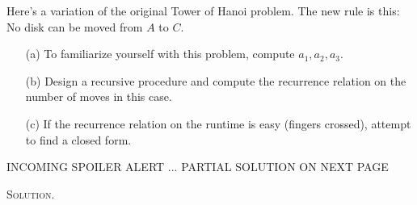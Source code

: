 
\begin{ex}
Here's a variation of the original Tower of Hanoi problem. 
The new rule is this: 
No disk can be moved from $A$ to $C$.
\begin{enumerate}[nosep]
\item[(a)]
To familiarize yourself with this problem, compute $a_1, a_2, a_3$.
\item[(b)]
Design a recursive procedure and compute the 
recurrence relation on the number of moves in this case.
\item[(c)] If the recurrence relation on the runtime is easy (fingers
crossed), attempt to find a closed form.
\end{enumerate}
\end{ex}

INCOMING SPOILER ALERT ... PARTIAL SOLUTION ON NEXT PAGE

\newpage
\textsc{Solution.}


